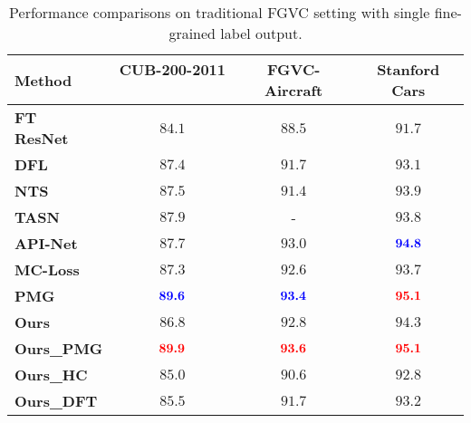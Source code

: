 \documentclass[final]{cvpr}
\def\blue#1{\textcolor[rgb]{0,0,1}{#1}}
\def\red#1{\textcolor[rgb]{1,0,0}{#1}}
\begin{document}
\begin{table}[t]
  \centering
  \footnotesize

\begin{adjustbox}{width=\linewidth,center}
\begin{tabular}{l@{}c@{}c@{}c}
    \hline
    \textbf{Method   }                                      & \textbf{CUB-200-2011}      \        &\textbf{ FGVC-Aircraft }                &\textbf{ Stanford Cars }   \\
    \hline
    \hline
    \textbf{FT ResNet}~\cite{wang2018learning}                  & $84.1$                                            & $88.5$                        & $91.7$            \\
    \textbf{DFL}~\cite{wang2018learning}                    & $87.4$                                            & $91.7$                        & $93.1$             \\
    \textbf{NTS}~\cite{yang2018learning}                    & $87.5$                                            & $91.4$                        & $93.9$   \\
    \textbf{TASN}~\cite{Zheng_2019_CVPR}                      & $87.9$                                            &      -                        & $93.8$                  \\
    \textbf{API-Net}~\cite{zhuang2020learning}                  & $87.7$                                            & $93.0$                        & $\textbf{\blue{94.8}}$   \\    
    \textbf{MC-Loss}~\cite{chang2020mc}                         & $87.3$                                            & $92.6$                        & $93.7$  \\   
    \textbf{PMG}~\cite{du2020fine}                             & $\textbf{\blue{89.6}}$                       & $\textbf{\blue{93.4}}$   & $\textbf{\red{95.1}}$   \\   
    \hline
    \hline

    \textbf{Ours  }                                                      & $86.8$                                              & $92.8$                         &  $94.3$  \\   
    \textbf{Ours\_PMG }                                                  & $\textbf{\red{89.9}}$                               & $\textbf{\red{93.6}}$          &  $\textbf{\red{95.1}}$       \\  
    \hline
    \hline
    \textbf{Ours\_HC }                                                  & $85.0$            & $90.6$                & $92.8$       \\   
    \textbf{Ours\_DFT }                                                 & $85.5$            &  $91.7$             &  $93.2$     \\   
    \hline
    \end{tabular}\end{adjustbox}
  \caption{Performance comparisons on traditional FGVC setting with single fine-grained label output.}
  \label{tab:SOTA}\vspace{-6mm}
\end{table}
\end{document}
